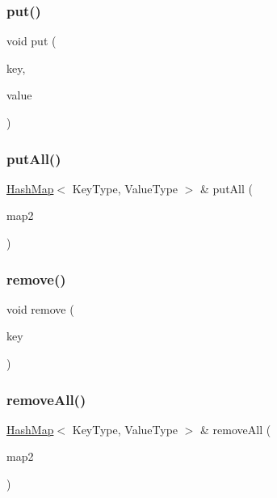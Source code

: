 \subsubsection{\texorpdfstring{put()}{put()}}
{\footnotesize\ttfamily void put (\begin{DoxyParamCaption}\item[{const Key\+Type \&}]{key,  }\item[{const Value\+Type \&}]{value }\end{DoxyParamCaption})}

\mbox{\label{classHashMap_a59da5e6b9b66d6582a03c07254406a40}} 
\subsubsection{\texorpdfstring{put\+All()}{putAll()}}
{\footnotesize\ttfamily \mbox{\hyperlink{classHashMap}{Hash\+Map}}$<$ Key\+Type, Value\+Type $>$ \& put\+All (\begin{DoxyParamCaption}\item[{const \mbox{\hyperlink{classHashMap}{Hash\+Map}}$<$ Key\+Type, Value\+Type $>$ \&}]{map2 }\end{DoxyParamCaption})}

\mbox{\label{classHashMap_ac6e7e5198a9f1c8b2cc40fbd1d0eb3b0}} 
\subsubsection{\texorpdfstring{remove()}{remove()}}
{\footnotesize\ttfamily void remove (\begin{DoxyParamCaption}\item[{const Key\+Type \&}]{key }\end{DoxyParamCaption})}

\mbox{\label{classHashMap_a55a494654fd27076033553d9c8347ab8}} 
\subsubsection{\texorpdfstring{remove\+All()}{removeAll()}}
{\footnotesize\ttfamily \mbox{\hyperlink{classHashMap}{Hash\+Map}}$<$ Key\+Type, Value\+Type $>$ \& remove\+All (\begin{DoxyParamCaption}\item[{const \mbox{\hyperlink{classHashMap}{Hash\+Map}}$<$ Key\+Type, Value\+Type $>$ \&}]{map2 }\end{DoxyParamCaption})}

